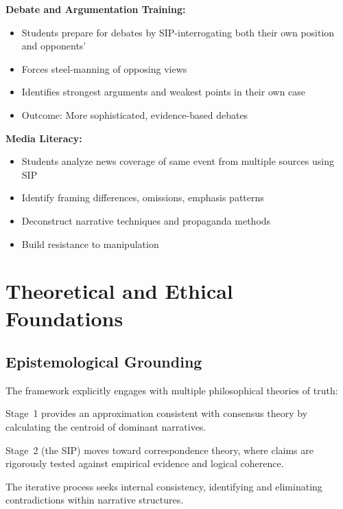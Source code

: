 \documentclass[11pt,a4paper]{article}
\begin{document}
\begin{small}
\textbf{Debate and Argumentation Training:}
\begin{itemize}[nosep]
    \item Students prepare for debates by SIP-interrogating both their own position and opponents'
    \item Forces steel-manning of opposing views
    \item Identifies strongest arguments and weakest points in their own case
    \item Outcome: More sophisticated, evidence-based debates
\end{itemize}

\textbf{Media Literacy:}
\begin{itemize}[nosep]
    \item Students analyze news coverage of same event from multiple sources using SIP
    \item Identify framing differences, omissions, emphasis patterns
    \item Deconstruct narrative techniques and propaganda methods
    \item Build resistance to manipulation
\end{itemize}

\section{Theoretical and Ethical Foundations}

\subsection{Epistemological Grounding}

The framework explicitly engages with multiple philosophical theories of truth:

\begin{description}[style=nextline]
\item[\textbf{Consensus Theory:}] Stage~1 provides an approximation consistent with consensus theory by calculating the centroid of dominant narratives.

\item[\textbf{Correspondence Theory:}] Stage~2 (the SIP) moves toward correspondence theory, where claims are rigorously tested against empirical evidence and logical coherence.

\item[\textbf{Coherence Theory:}] The iterative process seeks internal consistency, identifying and eliminating contradictions within narrative structures.


\end{description}
\end{small}
\end{document}

